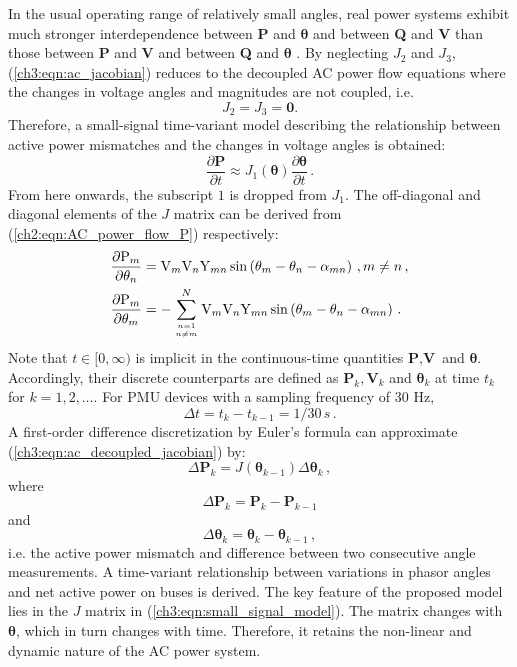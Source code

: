 In the usual operating range of relatively small angles, real power systems exhibit much stronger interdependence between \textbf{P} and $\boldsymbol{\theta}$ and between \textbf{Q} and \textbf{V} than those between \textbf{P} and \textbf{V} and between \textbf{Q} and $\boldsymbol{\theta}$ \cite{murty2017power}. By neglecting ${J}_2$ and ${J}_3$, (\ref{ch3:eqn:ac_jacobian}) reduces to the decoupled AC power flow equations where the changes in voltage angles and magnitudes are not coupled, i.e. 
$$
{J}_2 = {J}_3 = \mathbf{0}.
$$
Therefore, a small-signal time-variant model describing the relationship between active power mismatches and the changes in voltage angles is obtained: 
\begin{equation}
\label{ch3:eqn:ac_decoupled_jacobian}
\frac{\partial \textbf{P}}{\partial t} \approx {J}_1(\boldsymbol{\theta}) \frac{\partial \boldsymbol{\theta}}{\partial t}\,.
\end{equation}
From here onwards, the subscript $1$ is dropped from ${J}_1$. The off-diagonal and diagonal elements of the ${J}$ matrix can be derived from (\ref{ch2:eqn:AC_power_flow_P}) respectively:
\begin{subequations}
\label{ch3:eqn:elements_J}
\begin{align}
    \frac{\partial \text{P}_{m}}{\partial \theta_{n}} 
    & = \text{V}_{m} \text{V}_{n} \text{Y}_{m n} \sin \left( \theta_{m} - \theta_{n} - \alpha_{m n} \right) \,,  m \neq n \,,\label{ch3:eqn:elements_J_off}\\ 
    \frac{\partial \text{P}_{m}}{\partial \theta_{m}} 
    & = -\sum_{ n=1 \atop n \neq m}^{N} \text{V}_{m} \text{V}_{n} \text{Y}_{m n} \sin \left( \theta_{m} - \theta_{n} - \alpha_{m n} \right) \,. \label{ch3:eqn:elements_J_diag} 
\end{align}
\end{subequations}
Note that $t \in [0, \infty)$ is implicit in the continuous-time quantities $\textbf{P}, \textbf{V}$ and $\boldsymbol{\theta}$. Accordingly, their discrete counterparts are defined as $\textbf{P}_k, \textbf{V}_k$ and $\boldsymbol{\theta}_k$ at time $t_k$ for $k = 1, 2, \dots$. For PMU devices with a sampling frequency of 30 Hz, 
$$
\Delta t = t_{k} - t_{k-1} = 1/30 \,s \,.
$$  
A first-order difference discretization by Euler's formula can approximate (\ref{ch3:eqn:ac_decoupled_jacobian}) by:
\begin{equation}
\label{ch3:eqn:small_signal_model}
    \Delta \textbf{P}_k =  {J}(\boldsymbol{\theta}_{k-1}) \Delta \boldsymbol{\theta}_k \,,
\end{equation}
where 
$$
\Delta \textbf{P}_k = \textbf{P}_k - \textbf{P}_{k-1}
$$
and 
$$
\Delta \boldsymbol{\theta}_k = \boldsymbol{\theta}_k - \boldsymbol{\theta}_{k-1} \,,
$$
i.e. the active power mismatch and difference between two consecutive angle measurements. A time-variant relationship between variations in phasor angles and net active power on buses is derived. 
The key feature of the proposed model lies in the ${J}$ matrix in (\ref{ch3:eqn:small_signal_model}). The matrix changes with $\boldsymbol{\theta}$, which in turn changes with time. Therefore, it retains the non-linear and dynamic nature of the AC power system.  

